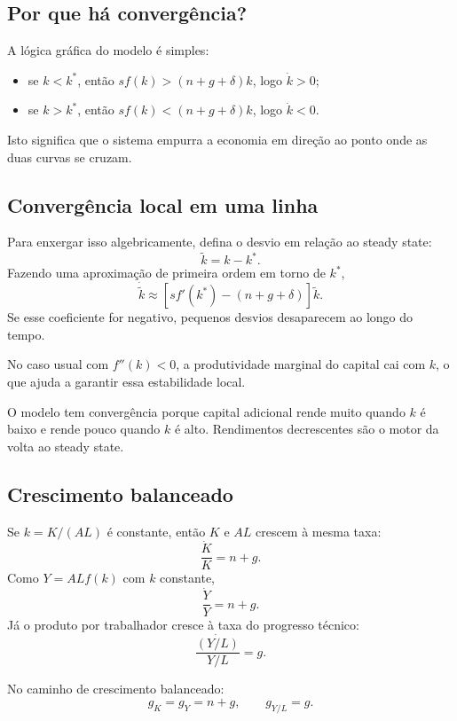 \documentclass[11pt,a4paper]{article}
\begin{document}
\subsection{Por que h\'a converg\^encia?}

A l\'ogica gr\'afica do modelo \'e simples:
\begin{itemize}
  \item se \(k<k^\ast\), ent\~ao \(sf(k)>(n+g+\delta)k\), logo \(\dot{k}>0\);
  \item se \(k>k^\ast\), ent\~ao \(sf(k)<(n+g+\delta)k\), logo \(\dot{k}<0\).
\end{itemize}

Isto significa que o sistema empurra a economia em dire\c{c}\~ao ao ponto onde
as duas curvas se cruzam.

\subsection{Converg\^encia local em uma linha}

Para enxergar isso algebricamente, defina o desvio em rela\c{c}\~ao ao steady
state:
\[
\widetilde{k}=k-k^\ast.
\]
Fazendo uma aproxima\c{c}\~ao de primeira ordem em torno de \(k^\ast\),
\[
\dot{\widetilde{k}}
\approx
\left[sf'(k^\ast)-(n+g+\delta)\right]\widetilde{k}.
\]
Se esse coeficiente for negativo, pequenos desvios desaparecem ao longo do
tempo.

No caso usual com \(f''(k)<0\), a produtividade marginal do capital cai com
\(k\), o que ajuda a garantir essa estabilidade local.

\begin{intuicao}
O modelo tem converg\^encia porque capital adicional rende muito quando \(k\) \'e
baixo e rende pouco quando \(k\) \'e alto. Rendimentos decrescentes s\~ao o motor
da volta ao steady state.
\end{intuicao}

\subsection{Crescimento balanceado}

Se \(k=K/(AL)\) \'e constante, ent\~ao \(K\) e \(AL\) crescem \`a mesma taxa:
\[
\frac{\dot K}{K}=n+g.
\]
Como \(Y=ALf(k)\) com \(k\) constante,
\[
\frac{\dot Y}{Y}=n+g.
\]
J\'a o produto por trabalhador cresce \`a taxa do progresso t\'ecnico:
\[
\frac{\dot{(Y/L)}}{Y/L}=g.
\]

\begin{resultado}
No caminho de crescimento balanceado:
\[
g_K=g_Y=n+g,
\qquad
g_{Y/L}=g.
\]
\end{resultado}
\end{document}
